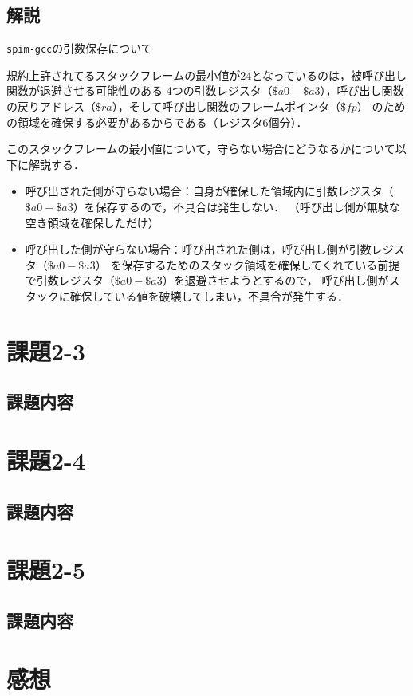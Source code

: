 \documentclass[a4j,11pt]{jarticle}
\begin{document}
\subsection{解説}

{\tt spim-gcc}の引数保存について


規約上許されてるスタックフレームの最小値が$24$となっているのは，被呼び出し関数が退避させる可能性のある
4つの引数レジスタ（$\$a0-\$a3$），呼び出し関数の戻りアドレス（$\$ra$），そして呼び出し関数のフレームポインタ（$\$fp$）
のための領域を確保する必要があるからである（レジスタ6個分）．

このスタックフレームの最小値について，守らない場合にどうなるかについて以下に解説する．
\begin{itemize}
      \item 呼び出された側が守らない場合：自身が確保した領域内に引数レジスタ（$\$a0-\$a3$）を保存するので，不具合は発生しない．
      （呼び出し側が無駄な空き領域を確保しただけ）
      \item 呼び出した側が守らない場合：呼び出された側は，呼び出し側が引数レジスタ（$\$a0-\$a3$）
      を保存するためのスタック領域を確保してくれている前提で引数レジスタ（$\$a0-\$a3$）を退避させようとするので，
      呼び出し側がスタックに確保している値を破壊してしまい，不具合が発生する．
\end{itemize}


\section{課題2-3}

\subsection{課題内容}

\section{課題2-4}
\subsection{課題内容}

\section{課題2-5}

\subsection{課題内容}

\section{感想}
\end{document}

